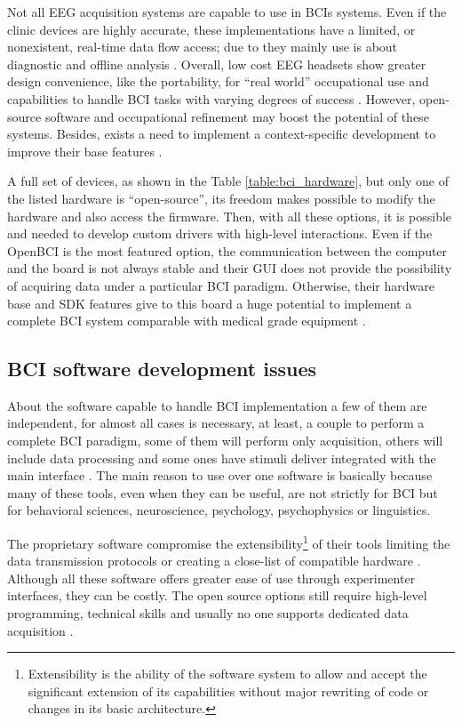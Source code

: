  Not all \gls*{EEG} acquisition systems are capable to use in \glspl*{BCI} systems. Even if the clinic devices are highly accurate, these implementations have a limited, or nonexistent, real-time data flow access; due to they mainly use is about diagnostic and offline analysis \cite{ordikhani2018augmenting}. Overall, low cost \gls*{EEG} headsets show greater design convenience, like the portability, for “real world” occupational use and capabilities to handle \gls*{BCI} tasks with varying degrees of success \cite{martinez2016low}. However, open-source software and occupational refinement may boost the potential of these systems. Besides, exists a need to implement a context-specific development to improve their base features \cite{larocco2020systemic}.

A full set of devices, as shown in the Table \ref{table:bci_hardware}, but only one of the listed hardware is “open-source”, its freedom makes possible to modify the hardware and also access the firmware. Then, with all these options, it is possible and needed to develop custom drivers with high-level interactions. Even if the OpenBCI is the most featured option, the communication between the computer and the board is not always stable \cite{peterson2020feasibility} and their \gls*{GUI} does not provide the possibility of acquiring data under a particular \gls*{BCI} paradigm. Otherwise, their hardware base and \gls*{SDK} features give to this board a huge potential to implement a complete \gls*{BCI} system comparable with medical grade equipment \cite{frey2016comparison}.

\subsection{BCI software development issues}

About the software capable to handle \gls*{BCI} implementation a few of them are independent, for almost all cases is necessary, at least, a couple to perform a complete \gls*{BCI} paradigm, some of them will perform only acquisition, others will include data processing and some ones have stimuli deliver integrated with the main interface \cite{brunner2018bci}. The main reason to use over one software is basically because many of these tools, even when they can be useful, are not strictly for \gls*{BCI} but for behavioral sciences, neuroscience, psychology, psychophysics or linguistics. 

The proprietary software compromise the extensibility\footnote{Extensibility is the ability of the software system to allow and accept the significant extension of its capabilities without major rewriting of code or changes in its basic architecture.} of their tools limiting the data transmission protocols or creating a close-list of compatible hardware \cite{lecuyer2008brain, palaus2017neural, bassolino2018non}. Although all these software offers greater ease of use through experimenter interfaces, they can be costly. The open source options still require high-level programming, technical skills and usually no one supports dedicated data acquisition \cite{nam2018brain}.

